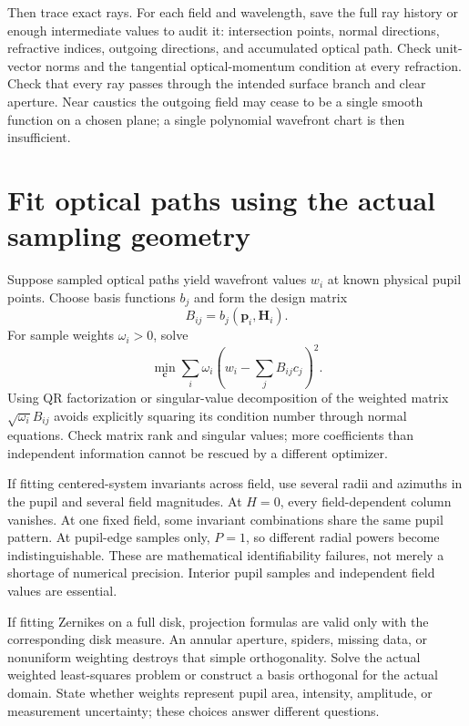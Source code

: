 Then trace exact rays. For each field and wavelength, save the full ray
history or enough intermediate values to audit it: intersection points,
normal directions, refractive indices, outgoing directions, and accumulated
optical path. Check unit-vector norms and the tangential optical-momentum
condition at every refraction. Check that every ray passes through the
intended surface branch and clear aperture. Near caustics the outgoing field
may cease to be a single smooth function on a chosen plane; a single
polynomial wavefront chart is then insufficient.

\section{Fit optical paths using the actual sampling geometry}
Suppose sampled optical paths yield wavefront values $w_i$ at known physical
pupil points. Choose basis functions $b_j$ and form the design matrix
\begin{equation}B_{ij}=b_j(\bm p_i,\bm H_i).\end{equation}
For sample weights $\omega_i>0$, solve
\begin{equation}
 \min_{\bm c}\sum_i\omega_i\left(w_i-\sum_jB_{ij}c_j\right)^2.
 \label{ab:fit}
\end{equation}
Using QR factorization or singular-value decomposition of the weighted
matrix $\sqrt{\omega_i}B_{ij}$ avoids explicitly squaring its condition
number through normal equations. Check matrix rank and singular values;
more coefficients than independent information cannot be rescued by a
different optimizer.

If fitting centered-system invariants across field, use several radii and
azimuths in the pupil and several field magnitudes. At $H=0$, every
field-dependent column vanishes. At one fixed field, some invariant
combinations share the same pupil pattern. At pupil-edge samples only,
$P=1$, so different radial powers become indistinguishable. These are
mathematical identifiability failures, not merely a shortage of numerical
precision. Interior pupil samples and independent field values are essential.

If fitting Zernikes on a full disk, projection formulas are valid only with
the corresponding disk measure. An annular aperture, spiders, missing data,
or nonuniform weighting destroys that simple orthogonality. Solve the actual
weighted least-squares problem or construct a basis orthogonal for the actual
domain. State whether weights represent pupil area, intensity, amplitude, or
measurement uncertainty; these choices answer different questions.

